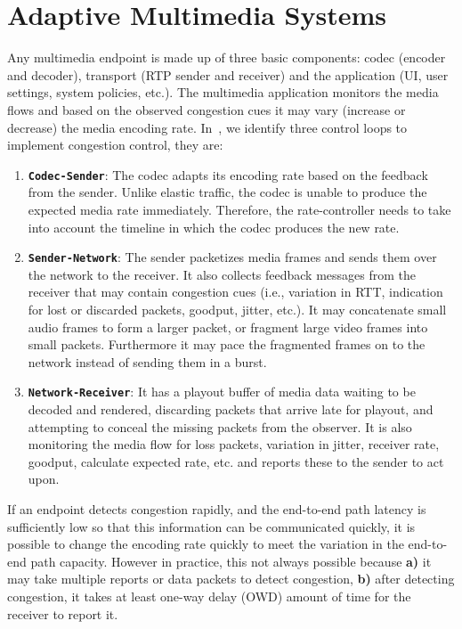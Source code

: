 \section{Adaptive Multimedia Systems}
\label{fw.amusys}

Any multimedia endpoint is made up of three basic components: codec (encoder
and decoder), transport (RTP sender and receiver) and the application (UI,
user settings, system policies, etc.). The multimedia application monitors the
media flows and based on the observed congestion cues it may vary (increase or
decrease) the media encoding rate. In~\cite{Singh:control.loops.api,
draft.rmcat.app.interaction}, we identify three control loops to implement
congestion control, they are:


\begin{enumerate}
\setlength{\itemsep}{0pt}

\item \textbf{\texttt{Codec-Sender}}: The codec adapts its encoding rate based
on the feedback from the sender. Unlike elastic traffic, the codec is unable
to produce the expected media rate immediately. Therefore, the rate-controller
needs to take into account the timeline in which the codec produces the new
rate.

\item \textbf{\texttt{Sender-Network}}: The sender packetizes media frames and
sends them over the network to the receiver. It also collects feedback
messages from the receiver that may contain congestion cues (i.e., variation
in RTT, indication for lost or discarded packets, goodput, jitter, etc.). It
may concatenate small audio frames to form a larger packet, or fragment large
video frames into small packets. Furthermore it may pace the fragmented frames
on to the network instead of sending them in a burst.

\item \textbf{\texttt{Network-Receiver}}: It has a playout buffer of media
data waiting to be decoded and rendered, discarding packets that arrive late
for playout, and attempting to conceal the missing packets from the observer.
It is  also monitoring the media flow for loss packets, variation in jitter,
receiver rate, goodput, calculate expected rate, etc. and reports these to the
sender to act upon.

\end{enumerate}

If an endpoint detects congestion rapidly, and the end-to-end path latency is
sufficiently low so that this information can be communicated quickly, it is
possible to change the encoding rate quickly to meet the variation in the 
end-to-end path capacity. However in practice, this not always possible because
\textbf{a)} it may take multiple reports or data packets to detect congestion,
\textbf{b)} after detecting congestion, it takes at least one-way delay (OWD)
amount of time for the receiver to report it.


